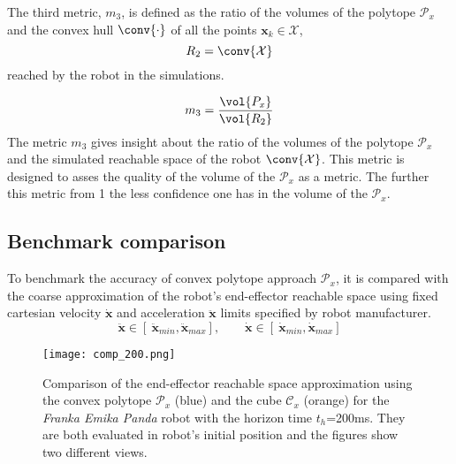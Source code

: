 The third metric, $m_3$, is defined as the ratio of the volumes of the polytope $\mathcal{P}_x$ and the convex hull $\conv{\cdot}$ of all the points $\bm{x}_k\in\mathcal{X}$, $$ R_2 = \conv{\mathcal{X}}$$ reached by the robot in the simulations.

\begin{equation}
    m_3 = \frac{\vol{P_x}}{\vol{ R_2 }}
\end{equation}
The metric $m_3$ gives insight about the ratio of the volumes of the polytope $\mathcal{P}_x$ and the simulated reachable space of the robot $\conv{\mathcal{X}}$. This metric is designed to asses the quality of the volume of the $\mathcal{P}_x$ as a metric. The further this metric from 1 the less confidence one has in the volume of the $\mathcal{P}_x$.

\subsection{Benchmark comparison}
\vspace{-0.1cm}
To benchmark the accuracy of convex polytope approach $\mathcal{P}_x$, it is compared with the coarse approximation of the robot's end-effector reachable space using fixed cartesian velocity $\dot{\bm{x}}$ and acceleration $\ddot{\bm{x}}$ limits specified by robot manufacturer.
\begin{equation}
    \ddot{\bm{x}}\in [~ \ddot{\bm{x}}_{min},  \ddot{\bm{x}}_{max}], \qquad \dot{\bm{x}} \in [~ \dot{\bm{x}}_{min},  \dot{\bm{x}}_{max}]
    \label{eq:limits_cart}
\end{equation}

\begin{figure}[!t]
    \centering
    \texttt{[image: comp\_200.png]}
    \caption{Comparison of the end-effector reachable space approximation using the convex polytope $\mathcal{P}_x$ (blue) and the cube $\mathcal{C}_x$ (orange) for the \textit{Franka Emika Panda} robot with the horizon time $t_h$=200ms. They are both evaluated in robot's initial position and the figures show two different views.}
    \label{fig:cube}
\vspace{-0.3cm}
\end{figure}


